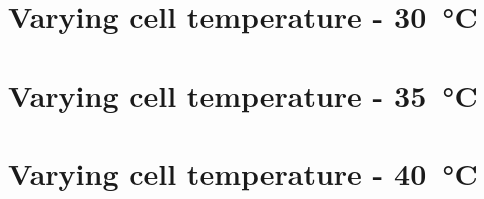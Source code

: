 \documentclass[a4paper,11pt]{article}
\begin{document}
\begin{appendices}
    \section{Varying cell temperature - \SI{30}{\celsius}}
    \label{dat:t30}
        
    \section{Varying cell temperature - \SI{35}{\celsius}}
    \label{dat:t35}
        
    \section{Varying cell temperature - \SI{40}{\celsius}}
    \label{dat:t40}
\end{appendices}



\end{document}
